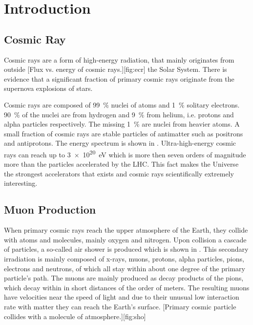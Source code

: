 \section{Introduction}
\subsection{Cosmic Ray}
Cosmic rays are a form of high-energy radiation, that mainly originates from outside
[Flux vs. energy of cosmic rays.][fig:ecr]
the Solar System. There is evidence that a significant fraction of primary cosmic rays originate from the supernova explosions of stars. \par 
Cosmic rays are composed of \SI{99}{\%} nuclei of atoms and \SI{1}{\%} solitary electrons.
\SI{90}{\%} of the nuclei are from hydrogen and \SI{9}{\%} from helium, i.e. protons and alpha particles respectively. The missing \SI{1}{\%} are nuclei from heavier atoms. A small fraction of cosmic rays are stable particles of antimatter such as positrons and antiprotons. The energy spectrum is shown in . Ultra-high-energy cosmic rays can reach up to \SI{3e20}{\electronvolt} which is more then seven orders of magnitude more than the particles accelerated by the \ac{LHC}. This fact makes the Universe the strongest accelerators that exists and cosmic rays scientifically extremely interesting.\cite{wiki:csr}

\subsection{Muon Production}
When primary cosmic rays reach the upper atmosphere of the Earth, they collide with atoms and molecules, mainly oxygen and nitrogen. Upon collision a cascade of particles, a so-called air shower is produced which is shown in . This secondary irradiation is mainly composed of x-rays, muons, protons, alpha particles, pions, electrons and neutrons, of which all stay within about one degree of the primary particle's path. The muons are mainly produced as decay products of the pions, which decay within in short distances of the order of meters. The resulting muons have velocities near the speed of light and due to their unusual low interaction rate with matter they can reach the Earth's surface.
[Primary cosmic particle collides with a molecule of atmosphere.][fig:sho]

	






